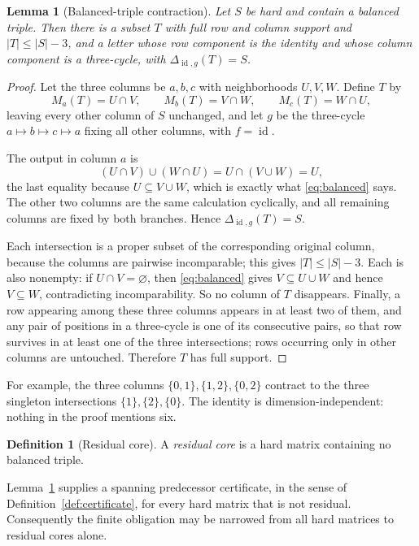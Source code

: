 \documentclass[11pt,letterpaper]{article}
\numberwithin{equation}{section}
\newtheorem{lemma}[theorem]{Lemma}
\theoremstyle{definition}
\newtheorem{definition}[theorem]{Definition}
\theoremstyle{remark}
\newcommand{\id}{\operatorname{id}}
\begin{document}
\begin{lemma}[Balanced-triple contraction]\label{lem:triple}
Let $S$ be hard and contain a balanced triple. Then there is a subset $T$ with
full row and column support and $|T|\le|S|-3$, and a letter whose row
component is the identity and whose column component is a three-cycle, with
$\Delta_{\id,g}(T)=S$.
\end{lemma}
\begin{proof}
Let the three columns be $a,b,c$ with neighborhoods $U,V,W$. Define $T$ by
\[
 M_a(T)=U\cap V,\qquad M_b(T)=V\cap W,\qquad M_c(T)=W\cap U,
\]
leaving every other column of $S$ unchanged, and let $g$ be the three-cycle
$a\mapsto b\mapsto c\mapsto a$ fixing all other columns, with $f=\id$.

The output in column $a$ is
\[
 (U\cap V)\cup(W\cap U)=U\cap(V\cup W)=U,
\]
the last equality because $U\subseteq V\cup W$, which is exactly what
\eqref{eq:balanced} says. The other two columns are the same calculation
cyclically, and all remaining columns are fixed by both branches. Hence
$\Delta_{\id,g}(T)=S$.

Each intersection is a proper subset of the corresponding original column,
because the columns are pairwise incomparable; this gives $|T|\le|S|-3$. Each
is also nonempty: if $U\cap V=\varnothing$, then \eqref{eq:balanced} gives
$V\subseteq U\cup W$ and hence $V\subseteq W$, contradicting incomparability.
So no column of $T$ disappears. Finally, a row appearing among these three
columns appears in at least two of them, and any pair of positions in a
three-cycle is one of its consecutive pairs, so that row survives in at least
one of the three intersections; rows occurring only in other columns are
untouched. Therefore $T$ has full support.
\end{proof}

For example, the three columns $\{0,1\},\{1,2\},\{0,2\}$ contract to the three
singleton intersections $\{1\},\{2\},\{0\}$. The identity is
dimension-independent: nothing in the proof mentions six.

\begin{definition}[Residual core]\label{def:residual}
A \emph{residual core} is a hard matrix containing no balanced triple.
\end{definition}

Lemma~\ref{lem:triple} supplies a spanning predecessor certificate, in the
sense of Definition~\ref{def:certificate}, for every hard matrix that is not
residual. Consequently the finite obligation may be narrowed from all hard
matrices to residual cores alone.
\end{document}
